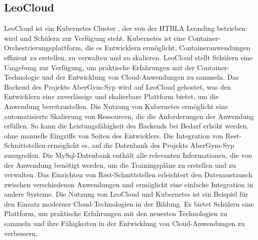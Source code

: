 \subsection{LeoCloud}
LeoCloud \cite{CanonicalApplication} ist ein Kubernetes Cluster \cite{KubernetesCluster}, der von der HTBLA Leonding betrieben wird und Schülern zur Verfügung steht. Kubernetes ist eine Container-Orchestrierungsplattform, die es Entwicklern ermöglicht, Containeranwendungen effizient zu erstellen, zu verwalten und zu skalieren. LeoCloud stellt Schülern eine Umgebung zur Verfügung, um praktische Erfahrungen mit der Container-Technologie und der Entwicklung von Cloud-Anwendungen zu sammeln.
\newline
\newline
Das Backend des Projekts AberGym-Syp wird auf LeoCloud gehostet, was den Entwicklern eine zuverlässige und skalierbare Plattform bietet, um die Anwendung bereitzustellen. Die Nutzung von Kubernetes ermöglicht eine automatisierte Skalierung von Ressourcen, die die Anforderungen der Anwendung erfüllen. So kann die Leistungsfähigkeit des Backends bei Bedarf erhöht werden, ohne manuelle Eingriffe von Seiten des Entwicklers.
\newline
\newline
Die Integration von Rest-Schnittstellen ermöglicht es, auf die Datenbank des Projekts AberGym-Syp zuzugreifen. Die MySql-Datenbank enthält alle relevanten Informationen, die von der Anwendung benötigt werden, um die Trainingspläne zu erstellen und zu verwalten. Das Einrichten von Rest-Schnittstellen erleichtert den Datenaustausch zwischen verschiedenen Anwendungen und ermöglicht eine einfache Integration in andere Systeme.
\newline
\newline
Die Nutzung von LeoCloud und Kubernetes ist ein Beispiel für den Einsatz moderner Cloud-Technologien in der Bildung. Es bietet Schülern eine Plattform, um praktische Erfahrungen mit den neuesten Technologien zu sammeln und ihre Fähigkeiten in der Entwicklung von Cloud-Anwendungen zu verbessern.